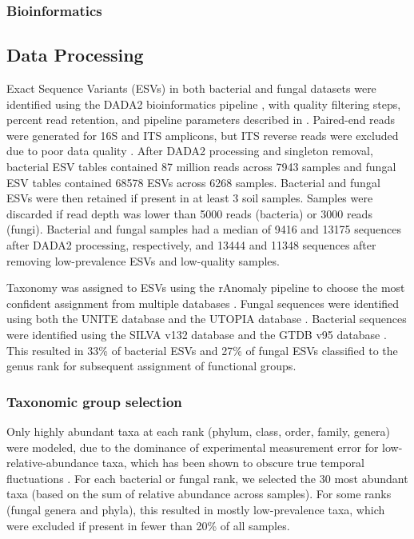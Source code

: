\documentclass[11pt]{article}
\begin{document}
\subsubsection{Bioinformatics}

\subsection{Data Processing}

Exact Sequence Variants (ESVs) in both bacterial and fungal datasets were identified using the DADA2 bioinformatics pipeline \cite{callahan_dada2:_2016}, with quality filtering steps, percent read retention, and pipeline parameters described in \cite{qin_dna_2021}. Paired-end reads were generated for 16S and ITS amplicons, but ITS reverse reads were excluded due to poor data quality \cite{qin_dna_2021}. After DADA2 processing and singleton removal, bacterial ESV tables contained 87 million reads across 7943 samples and fungal ESV tables contained 68578 ESVs across 6268 samples. Bacterial and fungal ESVs were then retained if present in at least 3 soil samples. Samples were discarded if read depth was lower than 5000 reads (bacteria) or 3000 reads (fungi). Bacterial and fungal samples had a median of 9416 and 13175 sequences after DADA2 processing, respectively, and 13444 and 11348 sequences after removing low-prevalence ESVs and low-quality samples.

Taxonomy was assigned to ESVs using the rAnomaly pipeline to choose the most confident assignment from multiple databases \cite{theil_ranomaly_2021}. Fungal sequences were identified using both the UNITE database \cite{nilsson_unite_2019} and the UTOPIA database \cite{theil_utopia_2019}. Bacterial sequences were identified using the SILVA v132 database \cite{quast_silva_2013} and the GTDB v95 database \cite{parks_gtdb_2021}. This resulted in 33\% of bacterial ESVs and 27\% of fungal ESVs classified to the genus rank for subsequent assignment of functional groups. 

\subsubsection{Taxonomic group selection}

Only highly abundant taxa at each rank (phylum, class, order, family, genera) were modeled, due to the dominance of experimental measurement error for low-relative-abundance taxa, which has been shown to obscure true temporal fluctuations \cite{jia_sequencing_2022}. For each bacterial or fungal rank, we selected the 30 most abundant taxa (based on the sum of relative abundance across samples). For some ranks (fungal genera and phyla), this resulted in mostly low-prevalence taxa, which were excluded if present in fewer than 20\% of all samples.
\end{document}
